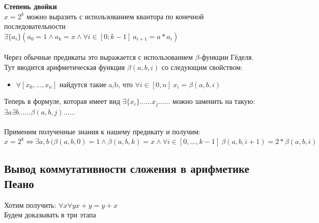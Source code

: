 \textbf{Степень двойки}\\
$x = 2^k $ можно выразить с использованием квантора по конечной последовательности\\
$\exists \{a_i\} (a_0 = 1 \wedge a_k = x \wedge \forall i \in [0;k-1] \ a_{i+1} = a*a_i)$
\\
\\
Через обычные предикаты это выражается с использованием $\beta$-функции Гёделя. 
\\
Тут вводится арифметическая функция $\beta(a,b,i)$ со следующим свойством:
\begin{itemize}
    \item[] $\forall [x_0, ..., x_n]$ найдутся такие a,b, что $\forall i \in [0,n] \ x_i = \beta(a,b,i)$
\end{itemize}
Теперь в формуле, которая имеет вид $\exists \{x_i\} ......x_j......$ можно заменить на такую: $\exists a \exists b ......\beta(a,b,j)......$
\\
\\
Применим полученные знания к нашему предикату и получим:\\
$x = 2^k \Longleftrightarrow \exists a,b \ (\beta(a,b,0) = 1 \wedge \beta(a,b,k) = x \wedge \forall i \in [0,..., k-1] \ \beta(a,b,i+1) = 2*\beta(a,b,i) $


\subsection{Вывод коммутативности сложения в арифметике Пеано}
Хотим получить: $\forall x \forall y x+y = y+x$ \\
Будем доказывать в три этапа \\

